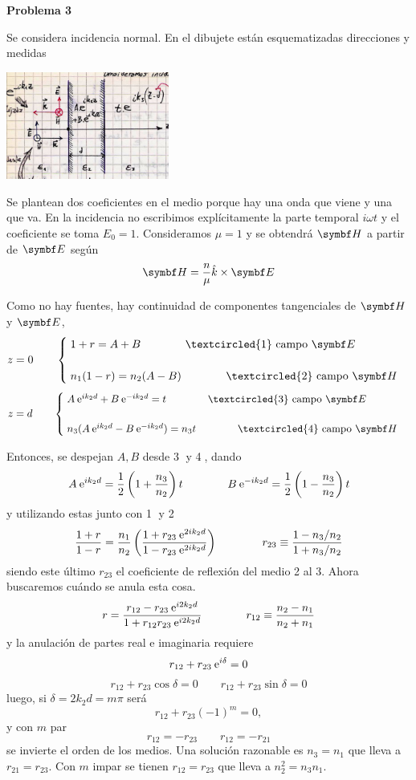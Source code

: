 \documentclass[10pt,oneside]{CBFT_book}
\begin{document}
\begin{ejemplo}{\bf Problema 3}

Se considera incidencia normal. En el dibujete están esquematizadas direcciones y medidas

\includegraphics[width=0.4\textwidth]{images/fig_ft1_problema3A_ondas.jpg}

Se plantean dos coeficientes en el medio porque hay una onda que viene y una que va. En la incidencia
no escribimos explícitamente la parte temporal $i \omega t$ y el coeficiente se toma $E_0=1$.
Consideramos $\mu=1$ y se obtendrá $\vb{H}$ a partir de $\vb{E}$ según
\[
	\vb{H} = \frac{n}{\mu} \hat{k}\times\vb{E}
\]

Como no hay fuentes, hay continuidad de componentes tangenciales de $\vb{H}$ y $\vb{E}$,
\[
	z = 0 \qquad 	\begin{cases}
			\; 1 + r = A + B \qquad\qquad \textcircled{1} \text{ campo } \vb{E} \\
			\\
			\; n_1 ( 1 - r ) = n_2 ( A - B ) \qquad \qquad \textcircled{2} \text{ campo } \vb{H}
			\end{cases}
\]
\[
	z = d \qquad 	\begin{cases}
			\; A \euler^{i k_2 d} + B \euler^{-i k_2 d} = t 
			\qquad\qquad \textcircled{3} \text{ campo } \vb{E} \\
			\\
			\; n_3 ( A \euler^{i k_2 d} - B \euler^{-i k_2 d} ) = n_3 t 
			\qquad\qquad \textcircled{4} \text{ campo } \vb{H} \\
			\end{cases}
\]

Entonces, se despejan $A,B$ desde \textcircled{3} y \textcircled{4}, dando
\[
	A \:\mathrm{e}^{ i k_2 d } = \frac 1 2 \left( 1 + \frac{ n_3 }{ n_2 } \right) t \qquad \qquad 
	B \:\mathrm{e}^{ - i k_2 d } = \frac 1 2 \left( 1 - \frac{ n_3 }{ n_2 } \right) t
\]
y utilizando estas junto con \textcircled{1} y \textcircled{2}
\[
	\frac{1+r}{1-r} = \frac{n_1}{n_2} \left( \frac{  1 + r_{23} \:\mathrm{e}^{2ik_2d} }{  1 - r_{23} \:\mathrm{e}^{2ik_2d}  } \right)
	\qquad \qquad r_{23} \equiv \frac{1 - n_3/n_2}{1 + n_3/n_2}
\]
siendo este último $r_{23}$ el coeficiente de reflexión del medio 2 al 3.
Ahora buscaremos cuándo se anula esta cosa.
\[
	r = \frac{ r_{12} - r_{23} \:\mathrm{e}^{i 2 k_2 d} }
	{ 1 + r_{12} r_{23} \:\mathrm{e}^{i 2 k_2 d} }
	\qquad \qquad r_{12} \equiv \frac{n_2 - n_1}{n_2 + n_1}
\]
y la anulación de partes real e imaginaria requiere
\[
	r_{12} + r_{23} \:\mathrm{e}^{i \delta} = 0 
\]
\[
	r_{12} + r_{23}\cos\delta = 0 \qquad r_{12} + r_{23}\sin\delta = 0
\]
luego, si $ \delta = 2 k_2 d = m \pi $ será
\[
	r_{12} + r_{23}(-1)^m = 0,
\]
y con $m$ par
\[
	r_{12} = -r_{23} \qquad r_{12} = -r_{21}
\]
se invierte el orden de los medios. Una solución razonable es $n_3=n_1$ que lleva a $r_{21} = r_{23}$.
Con $m$ impar se tienen $ r_{12} = r_{23} $ que lleva a $n_2^2 = n_3 n_1$.


\end{ejemplo}
\end{document}
